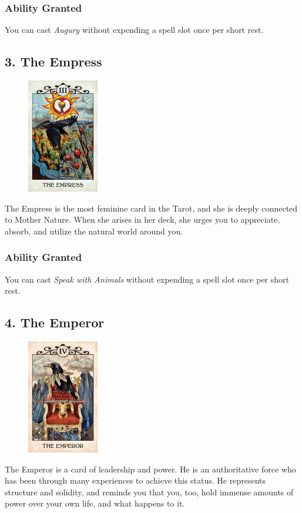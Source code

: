 \documentclass[10pt,twoside,twocolumn,openany,nodeprecatedcode]{dndbook}
\begin{document}
    \subsubsection*{Ability Granted}
    You can cast \emph{Augury} without expending a spell slot once per short rest.

    \subsection*{3. The Empress}

    \begin{figure}
        \includegraphics[height=5cm,width=\linewidth]{empress.jpg}
    \end{figure}
    The Empress is the most feminine card in the Tarot, and she is deeply connected to Mother Nature. When she arises in her deck, she urges you to appreciate, absorb, and utilize the natural world around you.
    \vspace*{50pt}
    \subsubsection*{Ability Granted}
    You can cast \emph{Speak with Animals} without expending a spell slot once per short rest.

    \subsection*{4. The Emperor}

    \begin{figure}
        \includegraphics[height=5cm,width=\linewidth]{emperor.jpg}
    \end{figure}
    The Emperor is a card of leadership and power. He is an authoritative force who has been through many experiences to achieve this status. He represents structure and solidity, and reminds you that you, too, hold immense amounts of power over your own life, and what happens to it.
    \vspace*{10pt}
\end{document}
